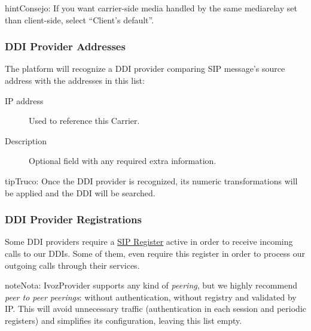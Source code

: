 \documentclass[letterpaper,10pt,spanish]{sphinxmanual}
\begin{document}
\begin{notice}{hint}{Consejo:}
If you want carrier-side media handled by the same mediarelay set than client-side, select ``Client's default''.
\end{notice}


\subsubsection{DDI Provider Addresses}
\label{administration_portal/brand/providers/ddi_providers:ddi-provider-addresses}
The platform will recognize a DDI provider comparing SIP message's source address with the addresses in this list:
\begin{description}
\item[{IP address}] \leavevmode{}\label{administration_portal/brand/providers/ddi_providers:term-ip-address}
Used to reference this Carrier.

\item[{Description}] \leavevmode{}\label{administration_portal/brand/providers/ddi_providers:term-6}
Optional field with any required extra information.

\end{description}

\begin{notice}{tip}{Truco:}
Once the DDI provider is recognized, its numeric transformations will be applied and the DDI will be searched.
\end{notice}


\subsubsection{DDI Provider Registrations}
\label{administration_portal/brand/providers/ddi_providers:ddi-provider-registrations}
Some DDI providers require a \href{https://tools.ietf.org/html/rfc3261\#section-10}{SIP Register} active in order to receive
incoming calls to our DDIs. Some of them, even require this register in order
to process our outgoing calls through their services.

\begin{notice}{note}{Nota:}
IvozProvider supports any kind of \emph{peering}, but we highly recommend
\emph{peer to peer peerings}: without authentication, without registry and
validated by IP. This will avoid unnecessary traffic (authentication in each
session and periodic registers) and simplifies its configuration, leaving this list empty.
\end{notice}
\end{document}
